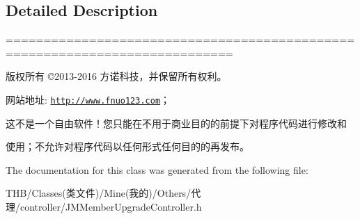 \subsection{Detailed Description}
============================================================================

版权所有 ©2013-\/2016 方诺科技，并保留所有权利。

网站地址\+: \href{http://www.fnuo123.com}{\tt http\+://www.\+fnuo123.\+com}； 



这不是一个自由软件！您只能在不用于商业目的的前提下对程序代码进行修改和

使用；不允许对程序代码以任何形式任何目的的再发布。 

 

The documentation for this class was generated from the following file\+:\begin{DoxyCompactItemize}
\item 
T\+H\+B/\+Classes(类文件)/\+Mine(我的)/\+Others/代理/controller/J\+M\+Member\+Upgrade\+Controller.\+h\end{DoxyCompactItemize}
